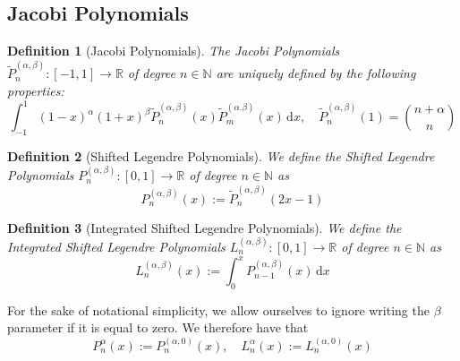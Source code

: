\documentclass[10pt,a4paper]{article}
\newtheorem{defn}{Definition}
\begin{document}
    
\subsection{Jacobi Polynomials}

    \begin{defn}[Jacobi Polynomials]
        The Jacobi Polynomials $\tilde{P}_n^{(\alpha,\beta)} : [-1, 1] \to \mathbb{R}$ of degree $n \in \mathbb{N}$ are uniquely defined by the following properties:
        \begin{equation*}
            \int_{-1}^1\! (1-x)^{\alpha}(1+x)^{\beta}\tilde{P}_n^{(\alpha,\beta)}(x)\tilde{P}_m^{(\alpha.\beta)}(x) \,\mathrm{d}x, \quad \tilde{P}_n^{(\alpha,\beta)}(1) = \binom{n+\alpha}{n}
        \end{equation*}
    \end{defn}

    \begin{defn}[Shifted Legendre Polynomials]
        We define the Shifted Legendre Polynomials $P_n^{(\alpha,\beta)} : [0, 1] \to \mathbb{R}$ of degree $n \in \mathbb{N}$ as
        \begin{equation*}
            P_n^{(\alpha,\beta)}(x) := \tilde{P}_n^{(\alpha,\beta)}(2x-1)
        \end{equation*}
    \end{defn}

    \begin{defn}[Integrated Shifted Legendre Polynomials]
        We define the Integrated Shifted Legendre Polynomials $L_n^{(\alpha,\beta)} : [0, 1] \to \mathbb{R}$ of degree $n \in \mathbb{N}$ as
        \begin{equation*}
            L_n^{(\alpha,\beta)}(x) := \int_0^x\! P_{n-1}^{(\alpha,\beta)}(x) \,\mathrm{d}x
        \end{equation*}
    \end{defn}

    For the sake of notational simplicity, we allow ourselves to ignore writing the $\beta$ parameter if it is equal to zero. We therefore have that
    \begin{equation*}
        P_n^{\alpha}(x) := P_n^{(\alpha,0)}(x), \quad L_n^{\alpha}(x) := L_n^{(\alpha,0)}(x)
    \end{equation*}
    
\end{document}
